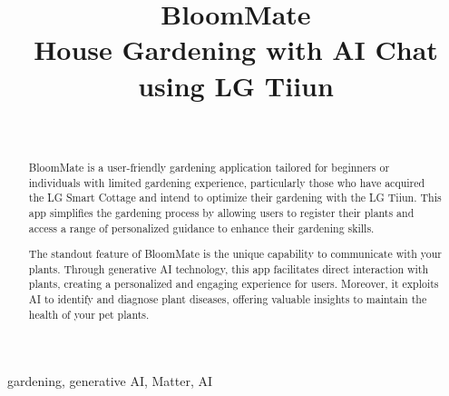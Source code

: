 \documentclass[conference, a4paper]{IEEEtran}
\begin{document}
\title{BloomMate\\{\small House Gardening with AI Chat using LG Tiiun  }}


\author{
\\
\and
{}
\and
{}
\and
{}
}





\maketitle
\thispagestyle{plain}
\pagestyle{plain}

\begin{abstract}
BloomMate is a user-friendly gardening application tailored for beginners or individuals with limited gardening experience, particularly those who have acquired the LG Smart Cottage and intend to optimize their gardening with the LG Tiiun. This app simplifies the gardening process by allowing users to register their plants and access a range of personalized guidance to enhance their gardening skills.

The standout feature of BloomMate is the unique capability to communicate with your plants. Through generative AI technology, this app facilitates direct interaction with plants, creating a personalized and engaging experience for users. Moreover, it exploits AI to identify and diagnose plant diseases, offering valuable insights to maintain the health of your pet plants.\\
\end{abstract}
\begin{IEEEkeywords}
gardening, generative AI, Matter, AI\\
\end{IEEEkeywords}
\newpage
\end{document}
